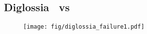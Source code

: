 
\subsection{Diglossia~\cite{diglossia} vs \sysname}
\label{appendix:diglossia_comparison}

\begin{figure}[h]
    \centering  
     \texttt{[image: fig/diglossia\_failure1.pdf]}
     \caption{}
    \label{fig:diglossia_failure_1} 
\end{figure}


